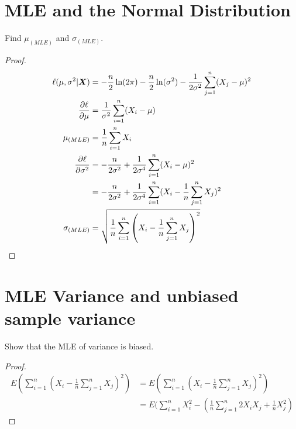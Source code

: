 \documentclass{article}
\begin{document}
\maketitle 
\setlength{\parindent}{0pt}

\section{MLE and the Normal Distribution}
    
    Find $\mu_{(MLE)}$ and $\sigma_{(MLE)}$. 
    \begin{proof}
    \begin{align*}
        \ell(\mu, \sigma^2 | \boldsymbol{X}) &= -\frac{n}{2}\ln(2\pi) -
        \frac{n}{2}\ln(\sigma^2) - \frac{1}{2\sigma^2}\sum_{j=1}^n (X_j - \mu)^2
        \\
        \frac{\partial \ell}{\partial \mu} &= \frac{1}{\sigma^2}\sum_{i=1}^n (X_i-\mu)
        \\
        \mu_{(MLE)} &= \frac{1}{n}\sum_{i=1}^n X_i
        \\
        \frac{\partial \ell}{\partial \sigma^2} &= -\frac{n}{2\sigma^2} +
        \frac{1}{2\sigma^4}\sum_{i=1}^n (X_i - \mu)^2
        \\
        &= -\frac{n}{2\sigma^2} +
        \frac{1}{2\sigma^4}\sum_{i=1}^n (X_i - \frac{1}{n}\sum_{j=1}^n X_j)^2
        \\
        \sigma_{(MLE)} &= \sqrt{\frac{1}{n}\sum_{i=1}^n\left(X_i -
        \frac{1}{n}\sum_{j=1}^n X_j\right)^2}
    \end{align*}
    \end{proof}

\section{MLE Variance and unbiased sample variance}
    Show that the MLE of variance is biased. 
    \begin{proof}
        \begin{align*}
            E\left(\sum_{i=1}^n \left(X_i - \frac{1}{n}\sum_{j=1}^n
            X_j\right)^2\right) &= E\left(\sum_{i=1}^n \left(X_i -
            \frac{1}{n}\sum_{j=1}^n
            X_j\right)^2\right)
            \\
            &= E(\sum_{i=1}^{n} X_i^2 - \left(\frac{1}{n}\sum_{j=1}^n 2X_iX_j +
            \frac{1}{n}X_j^2\right)
        \end{align*}
    \end{proof}
\end{document}
